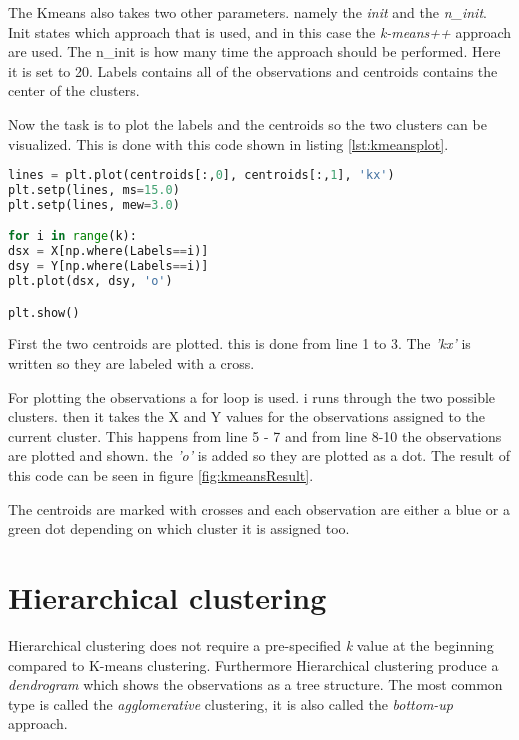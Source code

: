 The Kmeans also takes two other parameters. namely the \emph{init} and the \emph{n\_init}. Init states which approach that is used, and in this case the \emph{k-means++} approach are used. The n\_init is how many time the approach should be performed. Here it is set to 20.
Labels contains all of the observations and centroids contains the center of the clusters.

Now the task is to plot the labels and the centroids so the two clusters can be visualized. 
This is done with this code shown in listing \ref{lst:kmeansplot}.

\begin{lstlisting}[language=Python, label=lst:kmeansplot, caption=The code for plotting the two clusters]
lines = plt.plot(centroids[:,0], centroids[:,1], 'kx')
plt.setp(lines, ms=15.0)
plt.setp(lines, mew=3.0)

for i in range(k):
dsx = X[np.where(Labels==i)]
dsy = Y[np.where(Labels==i)]
plt.plot(dsx, dsy, 'o')

plt.show()
\end{lstlisting}

First the two centroids are plotted. this is done from line 1 to 3. The \emph{'kx'} is written so they are labeled with a cross.

For plotting the observations a for loop is used. i runs through the two possible clusters. then it takes the X and Y values for the observations assigned to the current cluster. This happens from line 5 - 7 and from line 8-10 the observations are plotted and shown. the \emph{'o'} is added so they are plotted as a dot. 
The result of this code can be seen in figure \ref{fig:kmeansResult}.


The centroids are marked with crosses and each observation are either a blue or a green dot depending on which cluster it is assigned too.


\section{Hierarchical clustering}
Hierarchical clustering does not require a pre-specified \emph{k} value at the beginning compared to K-means clustering.
Furthermore Hierarchical clustering produce a \emph{dendrogram} which shows the observations as a tree structure.
The most common type is called the \emph{agglomerative} clustering, it is also called the \emph{bottom-up} approach.

